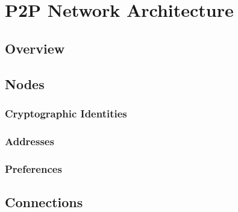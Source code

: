 \section{P2P Network Architecture}

\subsection{Overview}

\subsection{Nodes}

\subsubsection{Cryptographic Identities}

\subsubsection{Addresses}

\subsubsection{Preferences}

\subsection{Connections}

